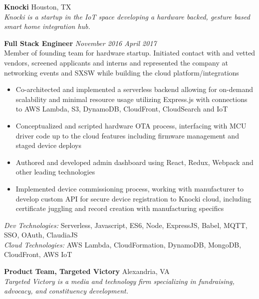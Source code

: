 \documentclass[10pt]{article}
\begin{document}
\textbf{Knocki} \hfill Houston, TX \\
\textit{Knocki is a startup in the IoT space developing a hardware backed, gesture based smart home integration hub.} \\
\begin{addmargin}[1em]{0em}
  \textbf{Full Stack Engineer} \hfill \textit{November 2016 \textendash{} April 2017} \\
  Member of founding team for hardware startup. Initiated contact with and vetted vendors, screened applicants and interns and represented the company at networking events and SXSW while building the cloud platform/integrations \\
  \vspace{-1.1em}
  \begin{itemize}
    \item Co-architected and implemented a serverless backend allowing for on-demand scalability and minimal resource usage utilizing Express.js with connections to AWS Lambda, S3, DynamoDB, CloudFront, CloudSearch and IoT
    \item Conceptualized and scripted hardware OTA process, interfacing with MCU driver code up to the cloud features including firmware management and staged device deploys
    \item Authored and developed admin dashboard using React, Redux, Webpack and other leading technologies
    \item Implemented device commissioning process, working with manufacturer to develop custom API for secure device registration to Knocki cloud, including certificate juggling and record creation with manufacturing specifics
  \end{itemize}
  \textit{Dev Technologies:} Serverless, Javascript, ES6, Node, ExpressJS, Babel, MQTT, SSO, OAuth, ClaudiaJS \\
  \textit{Cloud Technologies:} AWS Lambda, CloudFormation, DynamoDB, MongoDB, CloudFront, AWS IoT
\end{addmargin}
\textbf{Product Team, Targeted Victory} \hfill Alexandria, VA \\
\textit{Targeted Victory is a media and technology firm specializing in fundraising, advocacy, and constituency development.} \\
\end{document}
